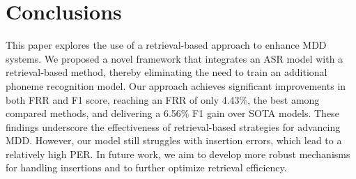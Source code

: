 \documentclass{article}
\begin{document}
\section{Conclusions}
This paper explores the use of a retrieval-based approach to enhance MDD systems. We proposed a novel framework that integrates an ASR model with a retrieval-based method, thereby eliminating the need to train an additional phoneme recognition model. Our approach achieves significant improvements in both FRR and F1 score, reaching an FRR of only 4.43\%, the best among compared methods, and delivering a 6.56\% F1 gain over SOTA models. These findings underscore the effectiveness of retrieval-based strategies for advancing MDD. However, our model still struggles with insertion errors, which lead to a relatively high PER. In future work, we aim to develop more robust mechanisms for handling insertions and to further optimize retrieval efficiency.

\vfill\pagebreak




\end{document}
